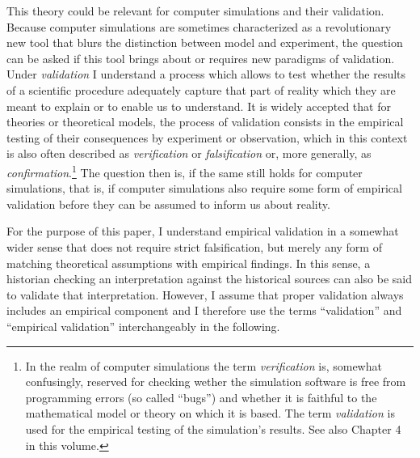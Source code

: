\documentclass[12pt, a4paper]{article}
\begin{document}
This theory could be relevant for computer simulations and their
validation. Because computer simulations are sometimes characterized
as a revolutionary new tool that blurs the distinction between model
and experiment, the question can be asked if this tool brings about or
requires new paradigms of validation. Under {\em validation} I
understand a process which allows to test whether the results of a
scientific procedure adequately capture that part of reality which
they are meant to explain or to enable us to understand. It is widely
accepted that for theories or theoretical models, the process of
validation consists in the empirical testing of their consequences by
experiment or observation, which in this context is also often
described as {\em verification} or {\em falsification} or, more
generally, as {\em confirmation}.\footnote{In the realm of computer
simulations the term {\em verification} is, somewhat confusingly,
reserved for checking wether the simulation software is free from
programming errors (so called ``bugs'') and whether it is faithful to
the mathematical model or theory on which it is based. The term {\em
validation} is used for the empirical testing of the simulation's
results. See also Chapter 4 \citep{murray-smith:2019} in this volume.}
The question then is, if the same still holds for computer
simulations, that is, if computer simulations also require some form
of empirical validation before they can be assumed to inform us about
reality.

For the purpose of this paper, I understand empirical validation in a
somewhat wider sense that does not require strict falsification, but
merely any form of matching theoretical assumptions with empirical
findings. In this sense, a historian checking an interpretation
against the historical sources can also be said to validate that
interpretation. However, I assume that proper validation always
includes an empirical component and I therefore use the terms
``validation'' and ``empirical validation'' interchangeably in the
following.
\end{document}
